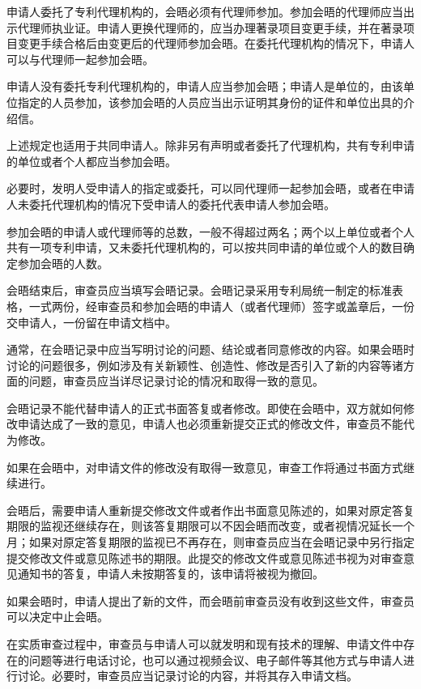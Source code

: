 申请人委托了专利代理机构的，会晤必须有代理师参加。参加会晤的代理师应当出示代理师执业证。申请人更换代理师的，应当办理著录项目变更手续，并在著录项目变更手续合格后由变更后的代理师参加会晤。在委托代理机构的情况下，申请人可以与代理师一起参加会晤。

申请人没有委托专利代理机构的，申请人应当参加会晤；申请人是单位的，由该单位指定的人员参加，该参加会晤的人员应当出示证明其身份的证件和单位出具的介绍信。

上述规定也适用于共同申请人。除非另有声明或者委托了代理机构，共有专利申请的单位或者个人都应当参加会晤。

必要时，发明人受申请人的指定或委托，可以同代理师一起参加会晤，或者在申请人未委托代理机构的情况下受申请人的委托代表申请人参加会晤。

参加会晤的申请人或代理师等的总数，一般不得超过两名；两个以上单位或者个人共有一项专利申请，又未委托代理机构的，可以按共同申请的单位或个人的数目确定参加会晤的人数。

会晤结束后，审查员应当填写会晤记录。会晤记录采用专利局统一制定的标准表格，一式两份，经审查员和参加会晤的申请人（或者代理师）签字或盖章后，一份交申请人，一份留在申请文档中。

通常，在会晤记录中应当写明讨论的问题、结论或者同意修改的内容。如果会晤时讨论的问题很多，例如涉及有关新颖性、创造性、修改是否引入了新的内容等诸方面的问题，审查员应当详尽记录讨论的情况和取得一致的意见。

会晤记录不能代替申请人的正式书面答复或者修改。即使在会晤中，双方就如何修改申请达成了一致的意见，申请人也必须重新提交正式的修改文件，审查员不能代为修改。

如果在会晤中，对申请文件的修改没有取得一致意见，审查工作将通过书面方式继续进行。

会晤后，需要申请人重新提交修改文件或者作出书面意见陈述的，如果对原定答复期限的监视还继续存在，则该答复期限可以不因会晤而改变，或者视情况延长一个月；如果对原定答复期限的监视已不再存在，则审查员应当在会晤记录中另行指定提交修改文件或意见陈述书的期限。此提交的修改文件或意见陈述书视为对审查意见通知书的答复，申请人未按期答复的，该申请将被视为撤回。

如果会晤时，申请人提出了新的文件，而会晤前审查员没有收到这些文件，审查员可以决定中止会晤。

在实质审查过程中，审查员与申请人可以就发明和现有技术的理解、申请文件中存在的问题等进行电话讨论，也可以通过视频会议、电子邮件等其他方式与申请人进行讨论。必要时，审查员应当记录讨论的内容，并将其存入申请文档。

